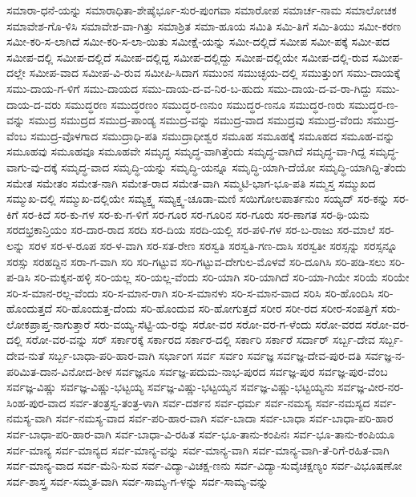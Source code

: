 ಸಮಾರಾ-ಧನೆ-ಯನ್ನು
ಸಮಾರಾಧಿತಾ-ಶೇಷೈರ್ಭೂ-ಸುರ-ಪುಂಗವಾ
ಸಮಾರೋಪ
ಸಮಾರ್ಚ-ನಾಮ
ಸಮಾಲೋಚಕ
ಸಮಾವೇಶ-ಗೊ-ಳಿಸಿ
ಸಮಾವೇಶ-ವಾ-ಗಿತ್ತು
ಸಮಾಶ್ರಿತ
ಸಮಾ-ಹೂಯ
ಸಮಿತಿ
ಸಮಿ-ತಿಗೆ
ಸಮಿ-ತಿಯು
ಸಮೀ-ಕರಣ
ಸಮೀ-ಕರಿ-ಸ-ಲಾಗಿದೆ
ಸಮೀ-ಕರಿ-ಸ-ಲಾ-ಯಿತು
ಸಮೀಕ್ಷೆ-ಯನ್ನು
ಸಮೀ-ದಲ್ಲಿದೆ
ಸಮೀಪ
ಸಮೀ-ಪಕ್ಕೆ
ಸಮೀ-ಪದ
ಸಮೀಪ-ದಲ್ಲಿ
ಸಮೀಪ-ದಲ್ಲಿದೆ
ಸಮೀಪ-ದಲ್ಲಿದ್ದ
ಸಮೀಪ-ದಲ್ಲಿದ್ದು
ಸಮೀಪ-ದಲ್ಲಿಯೇ
ಸಮೀಪ-ದಲ್ಲಿ-ರುವ
ಸಮೀಪ-ದಲ್ಲೇ
ಸಮೀಪ-ವಾದ
ಸಮೀಪ-ವಿ-ರುವ
ಸಮೀಪಿ-ಸಿದಾಗ
ಸಮುಂನ
ಸಮುಚ್ಛಯ-ದಲ್ಲಿ
ಸಮುತ್ತುಂಗ
ಸಮು-ದಾಯಕ್ಕೆ
ಸಮು-ದಾಯ-ಗ-ಳಿಗೆ
ಸಮು-ದಾಯದ
ಸಮು-ದಾಯ-ದ-ವ-ನಿರ-ಬ-ಹುದು
ಸಮು-ದಾಯ-ದ-ವ-ರಾ-ಗಿದ್ದು
ಸಮು-ದಾಯ-ದ-ವರು
ಸಮುದ್ಧರಣ
ಸಮುದ್ಧರಣಂ
ಸಮುದ್ಧರ-ಣನುಂ
ಸಮುದ್ಧರ-ಣನೂ
ಸಮುದ್ಧರ-ಣರು
ಸಮುದ್ಧರ-ಣ-ವನ್ನು
ಸಮುದ್ರ
ಸಮುದ್ರದ
ಸಮುದ್ರ-ಪಾಂಡ್ಯ
ಸಮುದ್ರ-ವನ್ನು
ಸಮುದ್ರ-ವಾದ
ಸಮುದ್ರವು
ಸಮುದ್ರ-ವೆಂದು
ಸಮುದ್ರ-ವೆಂಬ
ಸಮುದ್ರ-ವೊಳಗಾದ
ಸಮುದ್ರಾಧಿ-ಪತಿ
ಸಮುದ್ರಾಧೀಶ್ವರ
ಸಮೂಹ
ಸಮೂಹಕ್ಕೆ
ಸಮೂಹದ
ಸಮೂಹ-ವನ್ನು
ಸಮೂಹವು
ಸಮೂಹವೂ
ಸಮೂಹವೇ
ಸಮೃದ್ಧ
ಸಮೃದ್ಧ-ವಾಗಿತ್ತೆಂದು
ಸಮೃದ್ಧ-ವಾಗಿದೆ
ಸಮೃದ್ಧ-ವಾ-ಗಿದ್ದ
ಸಮೃದ್ಧ-ವಾಗು-ವು-ದಕ್ಕೆ
ಸಮೃದ್ಧ-ವಾದ
ಸಮೃದ್ಧಿ-ಯನ್ನು
ಸಮೃದ್ಧಿ-ಯನ್ನೂ
ಸಮೃದ್ಧಿ-ಯಾಗಿ-ದೆಯೋ
ಸಮೃದ್ಧಿ-ಯಾಗಿದ್ದಿ-ತೆಂದು
ಸಮೇತ
ಸಮೇತಂ
ಸಮೇತ-ನಾಗಿ
ಸಮೇತ-ರಾದ
ಸಮೇತ-ವಾಗಿ
ಸಮ್ಮಟಿ-ಭಾಗ-ಭೂ-ಪತಿ
ಸಮ್ಮಸ್ತ
ಸಮ್ಮುಖದ
ಸಮ್ಮುಖ-ದಲ್ಲಿ
ಸಮ್ಮುಖ-ದಲ್ಲಿಯೇ
ಸಮ್ಯಕ್ತ್ವ
ಸಮ್ಯಕ್ತ್ವ-ಚೂಡಾ-ಮಣಿ
ಸಯಿಗೋಲಪಾರ್ತನುಂ
ಸಯ್ಯದ್
ಸರ-ಕನ್ನು
ಸರ-ಕಿಗೆ
ಸರ-ಕಿದೆ
ಸರ-ಕು-ಗಳ
ಸರ-ಕು-ಗ-ಳಿಗೆ
ಸರ-ಗೂರ
ಸರ-ಗೂರಿನ
ಸರ-ಗೂರು
ಸರ-ಣಾಗತ
ಸರ-ಥಿ-ಯನು
ಸರದಭ್ರಕಾನ್ತಿಯಂ
ಸರ-ದಾರ-ರಾದ
ಸರದಿ
ಸರ-ದಿಯ
ಸರದಿ-ಯಲ್ಲಿ
ಸರ-ಪಳಿ-ಗಳ
ಸರ-ಬ-ರಾಜು
ಸರ-ಮಾಲೆ
ಸರ-ಲನ್ನು
ಸರಳ
ಸರ-ಳ-ರೂಪ
ಸರ-ಳ-ವಾಗಿ
ಸರ-ಸತ-ರೇಣ
ಸರಸ್ವತಿ
ಸರಸ್ವತಿ-ಗಣ-ದಾಸಿ
ಸರಸ್ವತೀ
ಸರಸ್ಸನ್ನು
ಸರಸ್ಸನ್ನೂ
ಸರಸ್ಸು
ಸರಹದ್ದಿನ
ಸರಾ-ಗ-ವಾಗಿ
ಸರಿ
ಸರಿ-ಗಟ್ಟುವ
ಸರಿ-ಗಟ್ಟುವ-ದೇಗುಲ-ಮೊಳವೆ
ಸರಿ-ದೂಗಿಸಿ
ಸರಿ-ಪಡಿ-ಸಲು
ಸರಿ-ಪ-ಡಿಸಿ
ಸರಿ-ಮಕ್ಕನ-ಹಳ್ಳಿ
ಸರಿ-ಯಲ್ಲ
ಸರಿ-ಯಲ್ಲ-ವೆಂದು
ಸರಿ-ಯಾಗಿ
ಸರಿ-ಯಾಗಿದೆ
ಸರಿ-ಯಾ-ಗಿಯೇ
ಸರಿಯೆ
ಸರಿಯೇ
ಸರಿ-ಸ-ಮಾನ-ರಲ್ಲ-ವೆಂದು
ಸರಿ-ಸ-ಮಾನ-ರಾಗಿ
ಸರಿ-ಸ-ಮಾನಳು
ಸರಿ-ಸ-ಮಾನ-ವಾದ
ಸರಿಸಿ
ಸರಿ-ಹೊಂದಿಸಿ
ಸರಿ-ಹೊಂದುತ್ತದೆ
ಸರಿ-ಹೊಂದುತ್ತ-ದೆಂದು
ಸರಿ-ಹೊಂದುವ
ಸರಿ-ಹೋಗುತ್ತದೆ
ಸರೀರ
ಸರೀ-ರದ
ಸರೀರ-ಸಂಪತ್ತಿಗೆ
ಸರು-ಲೋಕಪ್ರಾಪ್ತ-ನಾಗುತ್ತಾರೆ
ಸರು-ವಯ್ಯ-ಸೆಟ್ಟಿ-ಯ-ರನ್ನು
ಸರೋ-ವರ
ಸರೋ-ವರ-ಗ-ಳೆಂದು
ಸರೋ-ವರದ
ಸರೋ-ವರ-ದಲ್ಲಿ
ಸರೋ-ವರ-ವನ್ನು
ಸರ್
ಸರ್ಕಾರಕ್ಕೆ
ಸರ್ಕಾರದ
ಸರ್ಕಾರ-ದಲ್ಲಿ
ಸರ್ಕಾರಿ
ಸರ್ಕಾರೆ
ಸರ್ದಾರ್
ಸರ್ಬ್ಬ-ದೇವ
ಸರ್ಬ್ಬ-ದೇವ-ನುತೆ
ಸರ್ಬ್ಬ-ಬಾಧಾ-ಪರಿ-ಹಾರ-ವಾಗಿ
ಸರ್ಭಾಂಗ
ಸರ್ವ
ಸರ್ವಂ
ಸರ್ವಜ್ಞ
ಸರ್ವಜ್ಞ-ದೇವ-ಪುರ-ದತಿ
ಸರ್ವಜ್ಞ-ನ-ಪರಿಮಿತ-ದಾನ-ವಿನೋದ-ಶೀಳ
ಸರ್ವಜ್ಞನೂ
ಸರ್ವಜ್ಞ-ಪದುಮ-ನಾಭ-ಪುರದ
ಸರ್ವಜ್ಞ-ಪುರ
ಸರ್ವಜ್ಞ-ಪುರ-ವೆಂಬ
ಸರ್ವಜ್ಞ-ವಿಷ್ಣು
ಸರ್ವಜ್ಞ-ವಿಷ್ಣು-ಭಟ್ಟಯ್ಯ
ಸರ್ವಜ್ಞ-ವಿಷ್ಣು-ಭಟ್ಟಯ್ಯನ
ಸರ್ವಜ್ಞ-ವಿಷ್ಣು-ಭಟ್ಟಯ್ಯನು
ಸರ್ವಜ್ಞ-ವೀರ-ನರ-ಸಿಂಹ-ಪುರ-ವಾದ
ಸರ್ವ-ತಂತ್ರಸ್ವ-ತಂತ್ರ-ಳಾಗಿ
ಸರ್ವ-ದರ್ಶನ
ಸರ್ವ-ಧರ್ಮ
ಸರ್ವ-ನಮಸ್ಯ
ಸರ್ವ-ನಮಸ್ಯದ
ಸರ್ವ-ನಮಸ್ಯ-ವಾಗಿ
ಸರ್ವ-ನಮಸ್ಯ-ವಾದ
ಸರ್ವ-ಪರಿ-ಹಾರ-ವಾಗಿ
ಸರ್ವ-ಬಾದಾ
ಸರ್ವ-ಬಾಧಾ
ಸರ್ವ-ಬಾಧಾ-ಪರಿ-ಹಾರ
ಸರ್ವ-ಬಾಧಾ-ಪರಿ-ಹಾರ-ವಾಗಿ
ಸರ್ವ-ಬಾಧಾ-ವಿ-ರಹಿತ
ಸರ್ವ-ಭೂ-ತಾನು-ಕಂಪಿನಃ
ಸರ್ವ-ಭೂ-ತಾನು-ಕಂಪಿಯೂ
ಸರ್ವ-ಮಾನ್ಯ
ಸರ್ವ-ಮಾನ್ಯದ
ಸರ್ವ-ಮಾನ್ಯ-ವನ್ನು
ಸರ್ವ-ಮಾನ್ಯ-ವಾಗಿ
ಸರ್ವ-ಮಾನ್ಯ-ವಾಗಿ-ತೆ-ರಿಗೆ-ರಹಿತ-ವಾಗಿ
ಸರ್ವ-ಮಾನ್ಯ-ವಾದ
ಸರ್ವ-ಮೆನಿ-ಸುವ
ಸರ್ವ-ವಿದ್ಯಾ-ವಿಚಕ್ಷ-ಣನು
ಸರ್ವ-ವಿದ್ಯಾ-ಸುವೈಚಕ್ಷಣ್ಯಂ
ಸರ್ವ-ವಿಭೂಷಣೋ
ಸರ್ವ-ಶಾಸ್ತ್ರ
ಸರ್ವ-ಸಮ್ಮತ-ವಾಗಿ
ಸರ್ವ-ಸಾಮ್ಯ-ಗ-ಳನ್ನು
ಸರ್ವ-ಸಾಮ್ಯ-ವನ್ನು
